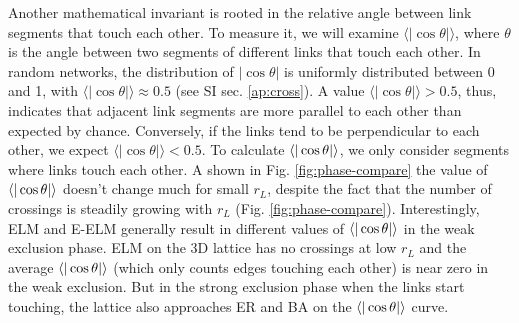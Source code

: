 \documentclass[nofootinbib,preprint,floatfix,endfloats]{revtex4} %
\begin{document}
Another mathematical invariant is rooted in the %
relative angle between link segments that touch each other. To measure it, 
we will examine $\langle |\cos\theta |\rangle$, where $\theta$ is the angle between two segments of different links that touch each other. 
%
In random networks,  %
the distribution of $|\cos\theta |$ is uniformly distributed between 0 and 1, with $\langle |\cos\theta |\rangle \approx 0.5$ (see SI sec. \ref{ap:cross}). 
A value $\langle |\cos\theta |\rangle > 0.5 $, thus, indicates that adjacent link segments are more parallel to each other than expected by chance. 
Conversely, if the links tend to be perpendicular to each other, we expect $\langle |\cos\theta |\rangle < 0.5 $. 
To calculate $\be{|\cos\theta|}$, we only consider segments where links touch each other. 
A shown in Fig. \ref{fig:phase-compare} the value of $\be{|\cos\theta|}$ doesn't change much for small $r_L$, despite the fact that the number of crossings is steadily growing with $r_L$ (Fig. \ref{fig:phase-compare}).
Interestingly, ELM and E-ELM  generally result in different values of $\be{|\cos\theta|}$ in the weak exclusion phase. 
ELM on the 3D lattice has no crossings at low $r_L$ and the average $\be{|\cos\theta|}$ (which only counts edges touching each other) is near zero in the weak exclusion. But in the strong exclusion phase when the links start touching, the lattice also approaches ER and BA on the $\be{|\cos\theta|}$ curve. 
\end{document}
